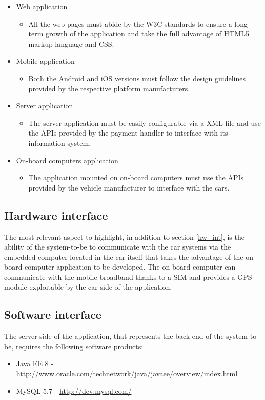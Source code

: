 \begin{itemize}
\item Web application
	\begin{itemize}
	\item[] All the web pages must abide by the W3C standards to ensure a long-term growth of the application and take the full advantage of HTML5 markup language and CSS.
	\end{itemize}
\item Mobile application
	\begin{itemize}
	\item[] Both the Android and iOS versions must follow the design guidelines provided by the respective platform manufacturers.
	\end{itemize}
\item Server application
	\begin{itemize}
	\item[] The server application must be easily configurable via a XML file and use the APIs provided by the payment handler to interface with its information system.
	\end{itemize}
\item On-board computers application
	\begin{itemize}
	\item[] The application mounted on on-board computers must use the APIs provided by the vehicle manufacturer to interface with the cars.
	\end{itemize}
\end{itemize}

\subsection{Hardware interface}
The most relevant aspect to highlight, in addition to section \ref{hw_int}, is the ability of the system-to-be to communicate with the car systems via the embedded computer located in the car itself that takes the advantage of the on-board computer application to be developed. The on-board computer can communicate with the mobile broadband thanks to a SIM and provides a GPS module exploitable by the car-side of the application.

\subsection{Software interface}
The server side of the application, that represents the back-end of the system-to-be, requires the following software products:
\begin{itemize}
\item Java EE 8 - \url{http://www.oracle.com/technetwork/java/javaee/overview/index.html}
\item MySQL 5.7 - \url{http://dev.mysql.com/}
\end{itemize}

